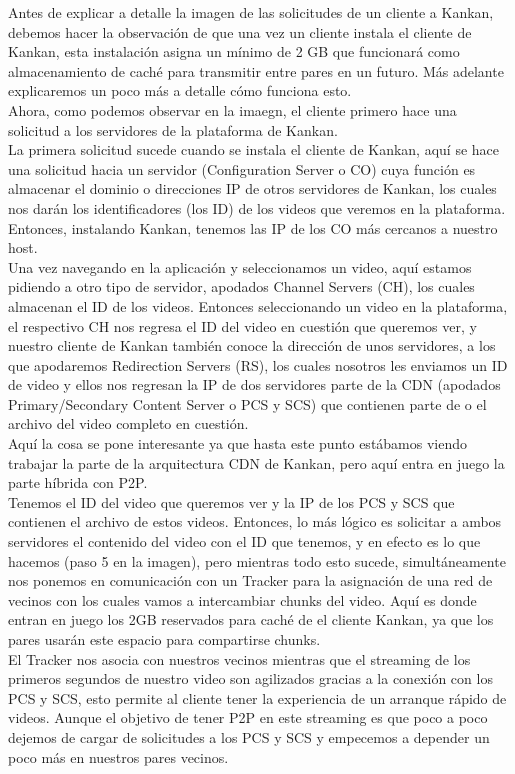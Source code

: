\documentclass[12pt]{report}
\begin{document}
Antes de explicar a detalle la imagen de las solicitudes de un cliente a Kankan, debemos hacer la observación de que una vez un cliente instala el cliente de Kankan, esta instalación asigna un mínimo de 2 GB que funcionará como almacenamiento de caché para transmitir entre pares en un futuro. Más adelante explicaremos un poco más a detalle cómo funciona esto.\\
Ahora, como podemos observar en la imaegn, el cliente primero hace una solicitud a los servidores de la plataforma de Kankan.\\
La primera solicitud sucede cuando se instala el cliente de Kankan, aquí se hace una solicitud hacia un servidor (Configuration Server o CO) cuya función es almacenar el dominio o direcciones IP de otros servidores de Kankan, los cuales nos darán los identificadores (los ID) de los videos que veremos en la plataforma. Entonces, instalando Kankan, tenemos las IP de los CO más cercanos a nuestro host.\\
Una vez navegando en la aplicación y seleccionamos un video, aquí estamos pidiendo a otro tipo de servidor, apodados Channel Servers (CH), los cuales almacenan el ID de los videos. Entonces seleccionando un video en la plataforma, el respectivo CH nos regresa el ID del video en cuestión que queremos ver, y nuestro cliente de Kankan también conoce la dirección de unos servidores, a los que apodaremos Redirection Servers (RS), los cuales nosotros les enviamos un ID de video y ellos nos regresan la IP de dos servidores parte de la CDN (apodados Primary/Secondary Content Server o PCS y SCS) que contienen parte de o el archivo del video completo en cuestión.\\
Aquí la cosa se pone interesante ya que hasta este punto estábamos viendo trabajar la parte de la arquitectura CDN de Kankan, pero aquí entra en juego la parte híbrida con P2P.\\
Tenemos el ID del video que queremos ver y la IP de los PCS y SCS que contienen el archivo de estos videos. Entonces, lo más lógico es solicitar a ambos servidores el contenido del video con el ID que tenemos, y en efecto es lo que hacemos (paso 5 en la imagen), pero mientras todo esto sucede, simultáneamente nos ponemos en comunicación con un Tracker para la asignación de una red de vecinos con los cuales vamos a intercambiar chunks del video. Aquí es donde entran en juego los 2GB reservados para caché de el cliente Kankan, ya que los pares usarán este espacio para compartirse chunks.\\
El Tracker nos asocia con nuestros vecinos mientras que el streaming de los primeros segundos de nuestro video son agilizados gracias a la conexión con los PCS y SCS, esto permite al cliente tener la experiencia de un arranque rápido de videos. Aunque el objetivo de tener P2P en este streaming es que poco a poco dejemos de cargar de solicitudes a los PCS y SCS y empecemos a depender un poco más en nuestros pares vecinos.\\
\end{document}
